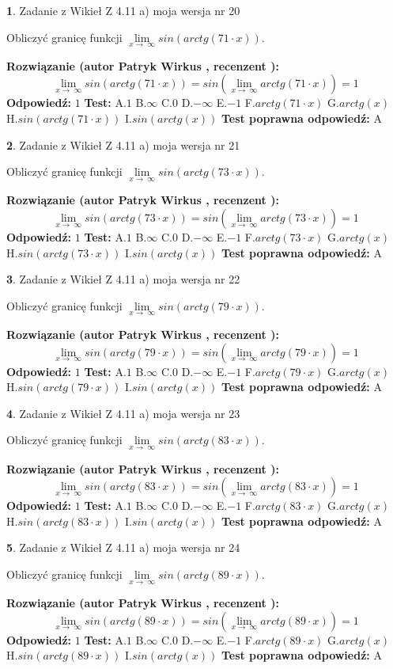 \documentclass[12pt, a4paper]{article}
\theoremstyle{definition} %
\newtheorem{zad}{}
\newcommand{\zadStart}[1]{\begin{zad}#1\newline}
\newcommand{\zadStop}{\end{zad}}
\newcommand{\rozwStart}[2]{\noindent \textbf{Rozwiązanie (autor #1 , recenzent #2): }\newline}
\newcommand{\rozwStop}{\newline}
\newcommand{\odpStart}{\noindent \textbf{Odpowiedź:}\newline}
\newcommand{\odpStop}{\newline}
\newcommand{\testStart}{\noindent \textbf{Test:}\newline}
\newcommand{\testStop}{\newline}
\newcommand{\kluczStart}{\noindent \textbf{Test poprawna odpowiedź:}\newline}
\newcommand{\kluczStop}{\newline}
\begin{document}
\zadStart{Zadanie z Wikieł Z 4.11 a) moja wersja nr 20}

Obliczyć granicę funkcji  $\lim\limits_{x\to\ \infty}sin(arctg(71\cdot x))$.
\zadStop
\rozwStart{Patryk Wirkus}{}
$$\lim\limits_{x\to\ \infty}sin(arctg(71\cdot x)) = sin(\lim\limits_{x\to\ \infty}arctg(71\cdot x)) = 1$$
\rozwStop
\odpStart
$1$
\odpStop
\testStart
A.$1$ B.$\infty$ C.$0$ D.$-\infty$ E.$-1$
F.$arctg(71\cdot x)$ G.$arctg(x)$
H.$sin(arctg(71\cdot x))$
I.$sin(arctg(x))$
\testStop
\kluczStart
A
\kluczStop



\zadStart{Zadanie z Wikieł Z 4.11 a) moja wersja nr 21}

Obliczyć granicę funkcji  $\lim\limits_{x\to\ \infty}sin(arctg(73\cdot x))$.
\zadStop
\rozwStart{Patryk Wirkus}{}
$$\lim\limits_{x\to\ \infty}sin(arctg(73\cdot x)) = sin(\lim\limits_{x\to\ \infty}arctg(73\cdot x)) = 1$$
\rozwStop
\odpStart
$1$
\odpStop
\testStart
A.$1$ B.$\infty$ C.$0$ D.$-\infty$ E.$-1$
F.$arctg(73\cdot x)$ G.$arctg(x)$
H.$sin(arctg(73\cdot x))$
I.$sin(arctg(x))$
\testStop
\kluczStart
A
\kluczStop



\zadStart{Zadanie z Wikieł Z 4.11 a) moja wersja nr 22}

Obliczyć granicę funkcji  $\lim\limits_{x\to\ \infty}sin(arctg(79\cdot x))$.
\zadStop
\rozwStart{Patryk Wirkus}{}
$$\lim\limits_{x\to\ \infty}sin(arctg(79\cdot x)) = sin(\lim\limits_{x\to\ \infty}arctg(79\cdot x)) = 1$$
\rozwStop
\odpStart
$1$
\odpStop
\testStart
A.$1$ B.$\infty$ C.$0$ D.$-\infty$ E.$-1$
F.$arctg(79\cdot x)$ G.$arctg(x)$
H.$sin(arctg(79\cdot x))$
I.$sin(arctg(x))$
\testStop
\kluczStart
A
\kluczStop



\zadStart{Zadanie z Wikieł Z 4.11 a) moja wersja nr 23}

Obliczyć granicę funkcji  $\lim\limits_{x\to\ \infty}sin(arctg(83\cdot x))$.
\zadStop
\rozwStart{Patryk Wirkus}{}
$$\lim\limits_{x\to\ \infty}sin(arctg(83\cdot x)) = sin(\lim\limits_{x\to\ \infty}arctg(83\cdot x)) = 1$$
\rozwStop
\odpStart
$1$
\odpStop
\testStart
A.$1$ B.$\infty$ C.$0$ D.$-\infty$ E.$-1$
F.$arctg(83\cdot x)$ G.$arctg(x)$
H.$sin(arctg(83\cdot x))$
I.$sin(arctg(x))$
\testStop
\kluczStart
A
\kluczStop



\zadStart{Zadanie z Wikieł Z 4.11 a) moja wersja nr 24}

Obliczyć granicę funkcji  $\lim\limits_{x\to\ \infty}sin(arctg(89\cdot x))$.
\zadStop
\rozwStart{Patryk Wirkus}{}
$$\lim\limits_{x\to\ \infty}sin(arctg(89\cdot x)) = sin(\lim\limits_{x\to\ \infty}arctg(89\cdot x)) = 1$$
\rozwStop
\odpStart
$1$
\odpStop
\testStart
A.$1$ B.$\infty$ C.$0$ D.$-\infty$ E.$-1$
F.$arctg(89\cdot x)$ G.$arctg(x)$
H.$sin(arctg(89\cdot x))$
I.$sin(arctg(x))$
\testStop
\kluczStart
A
\kluczStop
\end{document}
